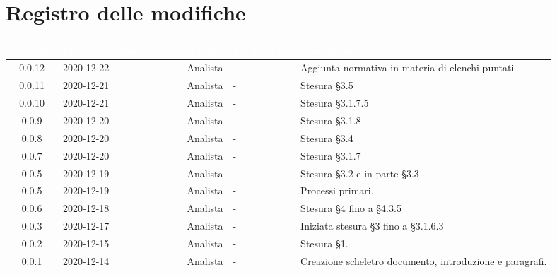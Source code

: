 \section*{Registro delle modifiche}
\setcounter{table}{-1}
{

\renewcommand{\arraystretch}{1.5}
\centering
\begin{longtable}{c C{2.6cm} C{2.6cm} C{2.6cm} C{2.6cm} C{3.5cm}}
\textcolor{white}{\textbf{Versione}}&
\textcolor{white}{\textbf{Data}}&
\textcolor{white}{\textbf{Nominativo}}&
\textcolor{white}{\textbf{Ruolo}}&
\textcolor{white}{\textbf{Verificatore}}&
\textcolor{white}{\textbf{Descrizione}}\\	
\endhead

0.0.12 & 2020-12-22 & \PA{} & Analista & - & Aggiunta normativa in materia di elenchi puntati \\
0.0.11 & 2020-12-21 & \RA{} & Analista & - & Stesura \S 3.5 \\
0.0.10 & 2020-12-21 & \PA{} & Analista & - & Stesura \S 3.1.7.5 \\
0.0.9 & 2020-12-20 & \PA{} & Analista & - & Stesura \S 3.1.8 \\
0.0.8 & 2020-12-20 & \RA{} & Analista & - & Stesura \S 3.4 \\
0.0.7 & 2020-12-20 & \PA{} & Analista & - & Stesura \S 3.1.7 \\
0.0.5 & 2020-12-19 & \RA{} & Analista & - & Stesura \S 3.2 e in parte \S 3.3 \\
0.0.5 & 2020-12-19 & \ZM{} & Analista & - & Processi primari. \\
0.0.6 & 2020-12-18 & \SH{} & Analista & - & Stesura \S 4 fino a \S 4.3.5\\
0.0.3 & 2020-12-17 & \PA{} & Analista & - & Iniziata stesura \S 3 fino a \S 3.1.6.3 \\
0.0.2 & 2020-12-15 & \PA{} & Analista & - & Stesura \S 1. \\
0.0.1 & 2020-12-14 & \ZM{} & Analista & - & Creazione scheletro documento, introduzione e paragrafi. \\
		
\end{longtable}
}
